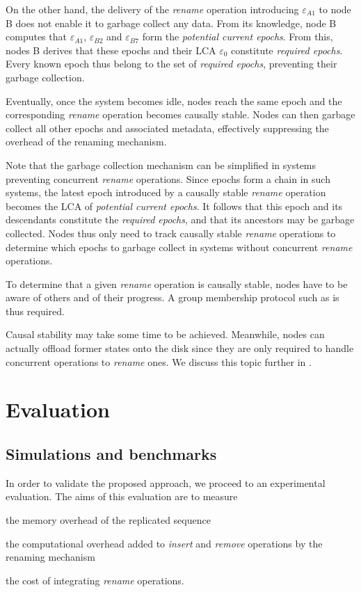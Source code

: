 \documentclass[10pt,journal,compsoc]{IEEEtran}
\newcommand{\epoch}[1]{$\varepsilon_{#1}$}
\begin{document}
On the other hand, the delivery of the \emph{rename} operation introducing \epoch{A1} to node B does not enable it to garbage collect any data.
From its knowledge, node B computes that \epoch{A1}, \epoch{B2} and \epoch{B7} form the \emph{potential current epochs}.
From this, nodes B derives that these epochs and their \ac{LCA} \epoch{0} constitute \emph{required epochs}.
Every known epoch thus belong to the set of \emph{required epochs}, preventing their garbage collection.

Eventually, once the system becomes idle, nodes reach the same epoch and the corresponding \emph{rename} operation becomes causally stable.
Nodes can then garbage collect all other epochs and associated metadata, effectively suppressing the overhead of the renaming mechanism.

Note that the garbage collection mechanism can be simplified in systems preventing concurrent \emph{rename} operations.
Since epochs form a chain in such systems, the latest epoch introduced by a causally stable \emph{rename} operation becomes the \ac{LCA} of \emph{potential current epochs}.
It follows that this epoch and its descendants constitute the \emph{required epochs}, and that its ancestors may be garbage collected.
Nodes thus only need to track causally stable \emph{rename} operations to determine which epochs to garbage collect in systems without concurrent \emph{rename} operations.

To determine that a given \emph{rename} operation is causally stable, nodes have to be aware of others and of their progress.
A group membership protocol such as \cite{swim2002,lifeguard2018} is thus required.

Causal stability may take some time to be achieved.
Meanwhile, nodes can actually offload former states onto the disk since they are only required to handle concurrent operations to \emph{rename} ones.
We discuss this topic further in .

\section{Evaluation}

\label{sec:evaluation}

\subsection{Simulations and benchmarks}

In order to validate the proposed approach, we proceed to an experimental evaluation.
The aims of this evaluation are to measure
\begin{enumerate*}[label=(\roman*)]
    \item the memory overhead of the replicated sequence
    \item the computational overhead added to \emph{insert} and \emph{remove} operations by the renaming mechanism
    \item the cost of integrating \emph{rename} operations.
\end{enumerate*}
\end{document}
